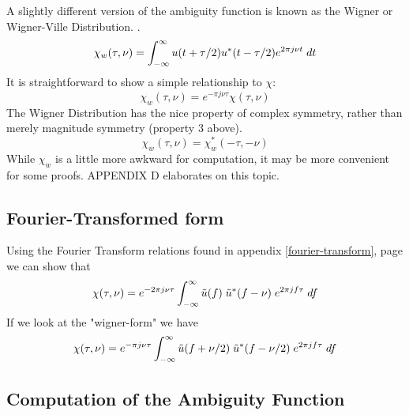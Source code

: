 A slightly different version of the ambiguity function is known as the
Wigner or Wigner-Ville Distribution. \cite{something}.
\begin{equation}
\chi_w(\tau,\nu) = \int_{-\infty}^\infty u(t + \tau/2) u^\ast(t-\tau/2) e^{2\pi j\nu t} \; dt 
\end{equation}
It is straightforward to show a simple relationship to $\chi$:
\begin{equation}
\chi_w(\tau,\nu) = e^{-\pi j \nu \tau} \chi(\tau, \nu)
\end{equation}
The Wigner Distribution has the nice property of complex symmetry, rather than
merely magnitude symmetry (property 3 above).
\begin{equation}
\chi_w(\tau,\nu) = \chi^\ast_w(-\tau,-\nu) 
\end{equation}
While $\chi_w$ is a little more awkward for computation, it may be more convenient for some proofs.
APPENDIX D elaborates on this topic.

\subsection{Fourier-Transformed form} 

Using the Fourier Transform relations found in appendix
\ref{fourier-transform}, page \pageref{fourier-transform}
we can show that
\begin{equation} \label{e:AF-def-alt}
\chi(\tau,\nu) = e^{-2\pi j \nu \tau} \int_{-\infty}^\infty \tilde{u}(f)\;
\tilde{u}^\ast(f-\nu) \;e^{2\pi j f \tau} \;df 
\end{equation}
If we look at the "wigner-form" we have
\begin{equation} \label{e:AF-def-alt}
\chi(\tau,\nu) = e^{-\pi j \nu \tau} \int_{-\infty}^\infty \tilde{u}(f + \nu/2)\;
\tilde{u}^\ast(f-\nu/2) \;e^{2\pi j f \tau} \;df 
\end{equation}


\subsection{Computation of the Ambiguity Function}

